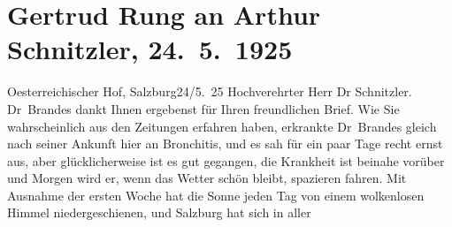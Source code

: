 

         
         \renewcommand{\erwaehntePersonen}{Personen: Georg Brandes, Gertrud Rung}
         \renewcommand{\erwaehnteOrte}{Orte: Kopenhagen, Salzburg, Wien, Österreichischer Hof}
         \renewcommand{\erwaehnteWerke}{}
               \section[Gertrud Rung an Arthur Schnitzler, 24. 5. 1925]{ Gertrud Rung an Arthur Schnitzler, 24. 5. 1925}\nopagebreak{}\rehead{ }\begin{ledgroupsized}[t]{13cm}\normalsize\beginnumbering{} \toendnotes[C]{\smallbreak\pagebreak[2]} 
\pstart
           \raggedleft{}{\pb}Oesterreichischer Hof, Salzburg24/5. 25\pend
           \pstart{}Hochverehrter Herr Dr Schnitzler.\pend\pstart
           Dr Brandes dankt Ihnen ergebenst für Ihren
               freundlichen Brief. Wie Sie wahrscheinlich aus den Zeitungen erfahren haben,
               erkrankte Dr Brandes gleich nach seiner
               Ankunft hier an Bronchitis, und es sah für ein paar Tage recht ernst aus, aber
               glücklicherweise ist es gut gegangen, die Krankheit ist beinahe vorüber und Morgen
                  {\pb}wird er, wenn das Wetter schön
               bleibt, spazieren fahren.\pend
           \pstart
           Mit Ausnahme der ersten Woche hat die Sonne jeden Tag von einem wolkenlosen Himmel
               niedergeschienen, und Salzburg hat sich in aller

\end{ledgroupsized}
